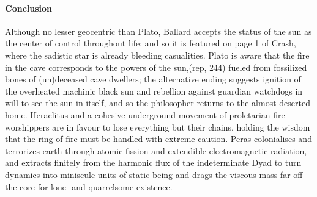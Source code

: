 \documentclass{article}
\begin{document}
\paragraph{Conclusion} 
Although no lesser geocentric than Plato, 
Ballard accepts the status of the sun as the center of control throughout life; 
and so it is featured on page 1 of Crash, where the sadistic star is already bleeding casualities.
Plato is aware that the fire in the cave corresponds to the powers of the sun,(rep, 244) 
fueled from fossilized bones of (un)deceased cave dwellers; 
the alternative ending suggests ignition of the overheated machinic black sun and
rebellion against guardian watchdogs in will to see the sun in-itself, 
and so the philosopher returns to the almost deserted home.
Heraclitus and a cohesive underground movement of proletarian fire-worshippers 
are in favour to lose everything but their chains,
holding the wisdom that the ring of fire must be handled with extreme caution.
Peras colonialises and terrorizes earth through
atomic fission and extendible electromagnetic radiation, 
and extracts finitely from the harmonic flux of the indeterminate Dyad to
turn dynamics into miniscule units of static being
and drags the viscous mass far off the core 
for lone- and quarrelsome existence.

\nocite{*}	%
\printbibliography%
\end{document}
